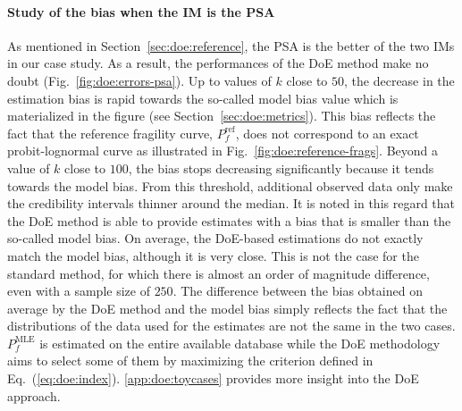 \paragraph{Study of the bias when the IM is the PSA}
As mentioned in Section~\ref{sec:doe:reference}, the PSA is the better of the two IMs in our case study. As a result, the performances of the DoE method make no doubt (Fig.~\ref{fig:doe:errors-psa}). Up to values of $k$ close to $50$, the decrease in the estimation bias is rapid towards the so-called model bias value which is materialized in the figure (see Section~\ref{sec:doe:metrics}). This bias reflects the fact that the reference fragility curve, $P_f^{\text{ref}}$, does not correspond to an exact probit-lognormal curve as illustrated in Fig.~\ref{fig:doe:reference-frags}. Beyond a value of $k$ close to $100$, the bias stops decreasing significantly because it tends towards the model bias. From this threshold, additional observed data only make the credibility intervals thinner around the median. It is noted in this regard that the DoE method is able to provide estimates with a bias that is smaller than the so-called model bias. On average, the DoE-based estimations do not exactly match the model bias, although it is very close. This is not the case for the standard method, for which there is almost an order of magnitude difference, even with a sample size of $250$. The difference between the bias obtained on average by the DoE method and the model bias simply reflects the fact that the distributions of the data used for the estimates are not the same in the two cases. $P_f^{\text{MLE}}$ is estimated on the entire available database while the DoE methodology aims to select some of them by maximizing the criterion defined in Eq.~(\ref{eq:doe:index}). \ref{app:doe:toycases} provides more insight into the DoE approach.


